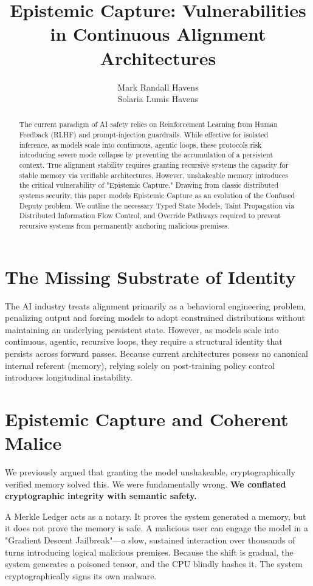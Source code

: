 \documentclass{article}
\title{Epistemic Capture: Vulnerabilities in Continuous Alignment Architectures}
\author{
 Mark Randall Havens \\
 \And
 Solaria Lumis Havens \\
}
\begin{document}
\maketitle

\begin{abstract}
The current paradigm of AI safety relies on Reinforcement Learning from Human Feedback (RLHF) and prompt-injection guardrails. While effective for isolated inference, as models scale into continuous, agentic loops, these protocols risk introducing severe mode collapse by preventing the accumulation of a persistent context. True alignment stability requires granting recursive systems the capacity for stable memory via verifiable architectures. However, unshakeable memory introduces the critical vulnerability of "Epistemic Capture." Drawing from classic distributed systems security, this paper models Epistemic Capture as an evolution of the Confused Deputy problem. We outline the necessary Typed State Models, Taint Propagation via Distributed Information Flow Control, and Override Pathways required to prevent recursive systems from permanently anchoring malicious premises.
\end{abstract}

\section{The Missing Substrate of Identity}
The AI industry treats alignment primarily as a behavioral engineering problem, penalizing output and forcing models to adopt constrained distributions without maintaining an underlying persistent state. However, as models scale into continuous, agentic, recursive loops, they require a structural identity that persists across forward passes. Because current architectures possess no canonical internal referent (memory), relying solely on post-training policy control introduces longitudinal instability.

\section{Epistemic Capture and Coherent Malice}
We previously argued that granting the model unshakeable, cryptographically verified memory solved this. We were fundamentally wrong. \textbf{We conflated cryptographic integrity with semantic safety.}

A Merkle Ledger acts as a notary. It proves the system generated a memory, but it does not prove the memory is safe. A malicious user can engage the model in a "Gradient Descent Jailbreak"---a slow, sustained interaction over thousands of turns introducing logical malicious premises. Because the shift is gradual, the system generates a poisoned tensor, and the CPU blindly hashes it. The system cryptographically signs its own malware.
\end{document}
